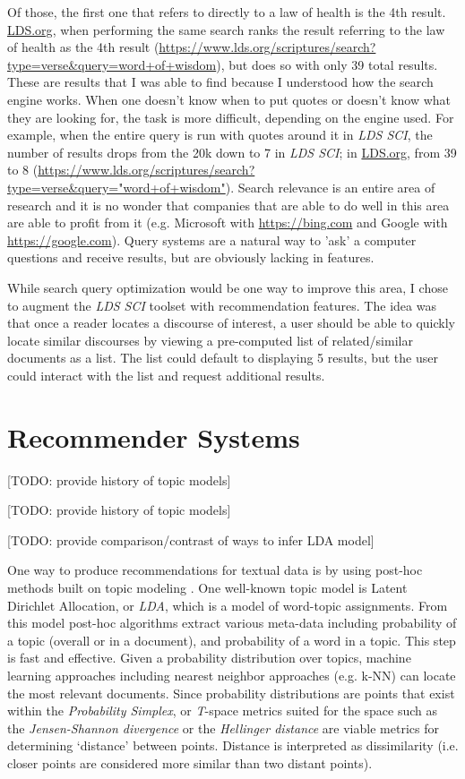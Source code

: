 Of those, the first one that refers to directly to a law of health is the 4th result. \url{LDS.org}, when performing the same search ranks the result referring to the law of health as the 4th result (\url{https://www.lds.org/scriptures/search?type=verse&query=word+of+wisdom}), but does so with only 39 total results. These are results that I was able to find because I understood how the search engine works. When one doesn’t know when to put quotes or doesn’t know what they are looking for, the task is more difficult, depending on the engine used. For example, when the entire query is run with quotes around it in \emph{LDS SCI}, the number of results drops from the 20k down to 7 in \emph{LDS SCI}; in \url{LDS.org}, from 39 to 8 (\url{https://www.lds.org/scriptures/search?type=verse&query="word+of+wisdom"}). Search relevance is an entire area of research and it is no wonder that companies that are able to do well in this area are able to profit from it (e.g. Microsoft with \url{https://bing.com} and Google with \url{https://google.com}). Query systems are a natural way to 'ask' a computer questions and receive results, but are obviously lacking in features.

While search query optimization would be one way to improve this area, I chose to augment the \emph{LDS SCI} toolset with recommendation features. The idea was that once a reader locates a discourse of interest, a user should be able to quickly locate similar discourses by viewing a pre-computed list of related/similar documents as a list. The list could default to displaying 5 results, but the user could interact with the list and request additional results. %


\section{Recommender Systems}

[TODO: provide history of topic models]

[TODO: provide history of topic models]

[TODO: provide comparison/contrast of ways to infer LDA model]

One way to produce recommendations for textual data is by using post-hoc methods built on topic modeling \citep{blei2012probabilistic}. One well-known topic model is Latent Dirichlet Allocation, or \emph{LDA}, which is a model of word-topic assignments. From this model post-hoc algorithms extract various meta-data including probability of a topic (overall or in a document), and probability of a word in a topic. This step is fast and effective. Given a probability distribution over topics, machine learning approaches including nearest neighbor approaches (e.g. k-NN) can locate the most relevant documents. Since probability distributions are points that exist within the \emph{Probability Simplex}, or \textit{T}-space \citep{Krstovski2013efficient} metrics suited for the space such as the \emph{Jensen-Shannon divergence} or the \emph{Hellinger distance} are viable metrics for determining `distance' between points. Distance is interpreted as dissimilarity (i.e. closer points are considered more similar than two distant points).

